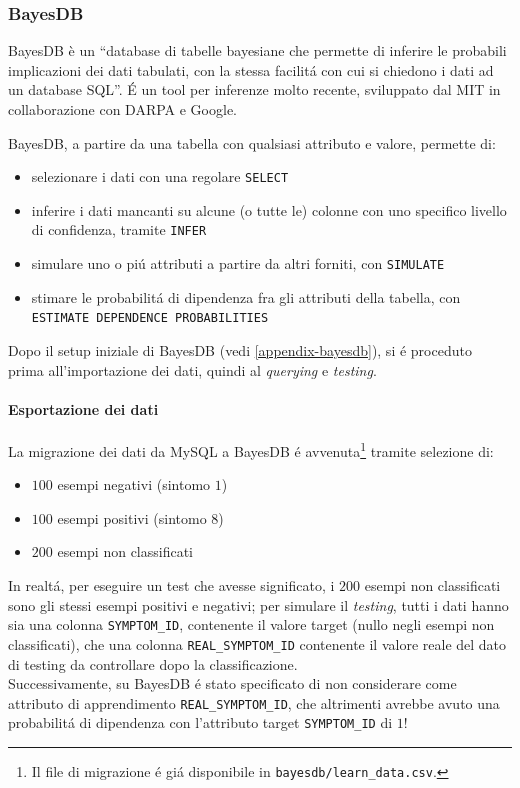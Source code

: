 \documentclass[preprint]{acm_proc_article-sp}
\begin{document}
\subsubsection{BayesDB}
BayesDB\cite{BayesDB:2014:Online} è un ``database di tabelle bayesiane che permette di inferire le probabili implicazioni dei dati tabulati, con la stessa facilit\'a con cui si chiedono i dati ad un database SQL''. \'E un tool per inferenze molto recente, sviluppato dal MIT in collaborazione con DARPA e Google.

BayesDB, a partire da una tabella con qualsiasi attributo e valore, permette di:
\begin{itemize}
\item selezionare i dati con una regolare \verb|SELECT|
\item inferire i dati mancanti su alcune (o tutte le) colonne con uno specifico livello di confidenza, tramite \verb|INFER|
\item simulare uno o pi\'u attributi a partire da altri forniti, con \verb|SIMULATE|
\item stimare le probabilit\'a di dipendenza fra gli attributi della tabella, con \verb|ESTIMATE DEPENDENCE PROBABILITIES|
\end{itemize}

Dopo il setup iniziale di BayesDB (vedi \ref{appendix-bayesdb}), si \'e proceduto prima all'importazione dei dati, quindi al \textit{querying} e \textit{testing}.

\paragraph{Esportazione dei dati}
La migrazione dei dati da MySQL a BayesDB \'e avvenuta\footnote{Il file di migrazione \'e gi\'a disponibile in \verb|bayesdb/learn_data.csv|.} tramite selezione di:
\begin{itemize}
\item $100$ esempi negativi (sintomo $1$)
\item $100$ esempi positivi (sintomo $8$)
\item $200$ esempi non classificati
\end{itemize}
In realt\'a, per eseguire un test che avesse significato, i $200$ esempi non classificati sono gli stessi esempi positivi e negativi; per simulare il \textit{testing}, tutti i dati hanno sia una colonna \verb|SYMPTOM_ID|, contenente il valore target (nullo negli esempi non classificati), che una colonna \verb|REAL_SYMPTOM_ID| contenente il valore reale del dato di testing da controllare dopo la classificazione.
\\
Successivamente, su BayesDB \'e stato specificato di non considerare come attributo di apprendimento \verb|REAL_SYMPTOM_ID|, che altrimenti avrebbe avuto una probabilit\'a di dipendenza con l'attributo target \verb|SYMPTOM_ID| di $1$!
\end{document}

